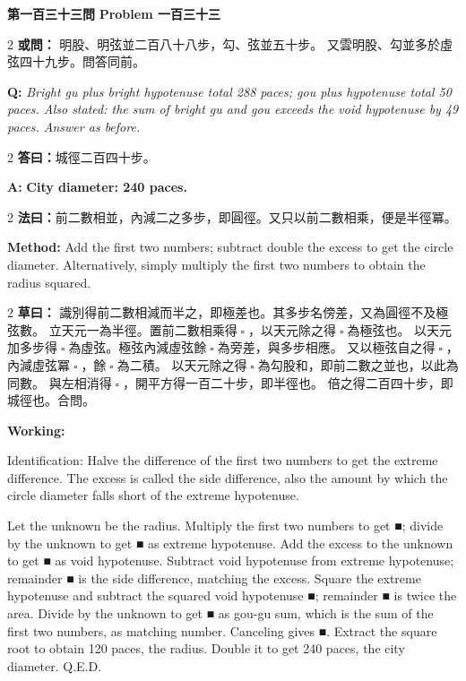 \documentclass[11pt,a4paper]{article}
\let\origsquare\square
\renewcommand{\square}{\ensuremath{\origsquare}}%
\newcommand{\wen}[1]{%
  \par\vspace{0.5em}%
  \noindent\textcolor{problemcolor}{\textbf{第#1問}}%
  \hfill\textcolor{problemcolor}{\textbf{Problem #1}}\par\nopagebreak%
  \vspace{0.3em}%
}
\newcommand{\owen}[1]{%
  \noindent\textcolor{problemcolor}{\textbf{或問：}}{\tradfont #1}\par\nopagebreak%
}
\newcommand{\oweneng}[1]{%
  \noindent\textcolor{engcolor}{\textbf{Q: }}{\itshape #1}\par\nopagebreak%
}
\newcommand{\fayue}[1]{%
  \noindent\textcolor{methodcolor}{\textbf{法曰：}}{\tradfont #1}\par\nopagebreak%
}
\newcommand{\fayueeng}[1]{%
  \noindent\textcolor{engcolor}{\textbf{Method: }}{#1}\par\nopagebreak%
}
\newcommand{\tsaoyue}[1]{%
  \noindent\textcolor{workcolor}{\textbf{草曰：}}{\tradfont #1}\par%
}
\newcommand{\tsaoyueeng}[1]{%
  \noindent\textcolor{engcolor}{\textbf{Working: }}{\small #1}\par%
}
\newcommand{\dayue}[1]{%
  \noindent\textcolor{anscolor}{\textbf{答曰：}}{\tradfont #1}\par\nopagebreak%
}
\newcommand{\dayueeng}[1]{%
  \noindent\textcolor{engcolor}{\textbf{A: }}{\bfseries #1}\par\nopagebreak%
}
\begin{document}
\vspace{0.5cm}

\wen{一百三十三}

\begin{paracol}{2}
\owen{%
明股、明弦並二百八十八步，勾、弦並五十步。
又雲明股、勾並多於虛弦四十九步。問答同前。}
\switchcolumn
\oweneng{%
Bright gu plus bright hypotenuse total 288 paces; gou plus hypotenuse total 50 paces. Also stated: the sum of bright gu and gou exceeds the void hypotenuse by 49 paces. Answer as before.}
\end{paracol}

\begin{paracol}{2}
\dayue{城徑二百四十步。}
\switchcolumn
\dayueeng{City diameter: 240 paces.}
\end{paracol}

\begin{paracol}{2}
\fayue{前二數相並，內減二之多步，即圓徑。又只以前二數相乘，便是半徑冪。}
\switchcolumn
\fayueeng{Add the first two numbers; subtract double the excess to get the circle diameter. Alternatively, simply multiply the first two numbers to obtain the radius squared.}
\end{paracol}

\begin{paracol}{2}
\tsaoyue{%
識別得前二數相減而半之，即極差也。其多步名傍差，又為圓徑不及極弦數。
立天元一為半徑。置前二數相乘得$ \; \square \; $，以天元除之得$ \; \square \; $為極弦也。
以天元加多步得$ \; \square \; $為虛弦。極弦內減虛弦餘$ \; \square \; $為旁差，與多步相應。
又以極弦自之得$ \; \square \; $，內減虛弦冪$ \; \square \; $，餘$ \; \square \; $為二積。
以天元除之得$ \; \square \; $為勾股和，即前二數之並也，以此為同數。
與左相消得$ \; \square \; $，開平方得一百二十步，即半徑也。
倍之得二百四十步，即城徑也。合問。}
\switchcolumn
\tsaoyueeng{%
Identification: Halve the difference of the first two numbers to get the extreme difference. The excess is called the side difference, also the amount by which the circle diameter falls short of the extreme hypotenuse.

Let the unknown be the radius. Multiply the first two numbers to get ■; divide by the unknown to get ■ as extreme hypotenuse. Add the excess to the unknown to get ■ as void hypotenuse. Subtract void hypotenuse from extreme hypotenuse; remainder ■ is the side difference, matching the excess. Square the extreme hypotenuse and subtract the squared void hypotenuse ■; remainder ■ is twice the area. Divide by the unknown to get ■ as gou-gu sum, which is the sum of the first two numbers, as matching number. Canceling gives ■. Extract the square root to obtain 120 paces, the radius. Double it to get 240 paces, the city diameter. Q.E.D.}
\end{paracol}
\end{document}
